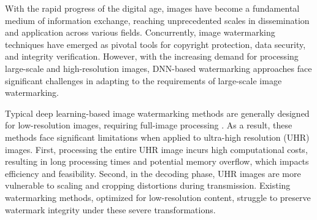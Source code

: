 \documentclass{article}
\begin{document}
With the rapid progress of the digital age, images have become a fundamental medium of information exchange, reaching unprecedented scales in dissemination and application across various fields.
Concurrently, image watermarking techniques have emerged as pivotal tools for copyright protection, data security, and integrity verification. However, with the increasing demand for processing large-scale and high-resolution images, DNN-based watermarking approaches face significant challenges in adapting to the requirements of large-scale image watermarking.



Typical deep learning-based image watermarking methods are generally designed for low-resolution images, requiring full-image processing \cite{zhu2018hidden, tancik2020stegastamp, DBLP:conf/mm/FangJMCZ22}. 
As a result, these methods face significant limitations when applied to ultra-high resolution (UHR) images.
First, processing the entire UHR image incurs high computational costs, resulting in long processing times and potential memory overflow, which impacts efficiency and feasibility. Second, in the decoding phase, UHR images are more vulnerable to scaling and cropping distortions during transmission. Existing watermarking methods, optimized for low-resolution content, struggle to preserve watermark integrity under these severe transformations.


\end{document}
